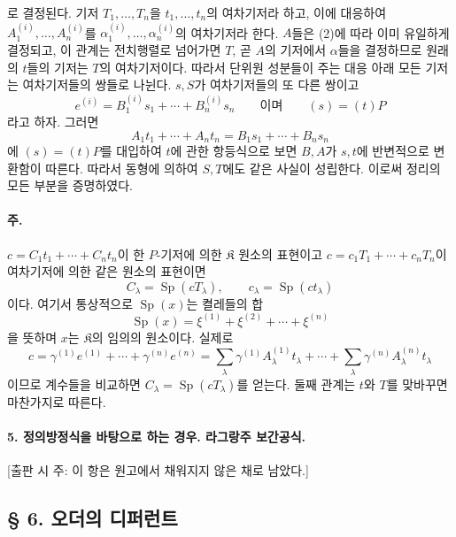 로 결정된다. 기저 \(T_1,\ldots,T_n\)을 \(t_1,\ldots,t_n\)의 여차기저라 하고, 이에 대응하여 \(A_1^{(i)},\ldots,A_n^{(i)}\)를 \(\alpha_1^{(i)},\ldots,\alpha_n^{(i)}\)의 여차기저라 한다. \(A\)들은 (2)에 따라 이미 유일하게 결정되고, 이 관계는 전치행렬로 넘어가면 \(T\), 곧 \(A\)의 기저에서 \(\alpha\)들을 결정하므로 원래의 \(t\)들의 기저는 \(T\)의 여차기저이다. 따라서 단위원 성분들이 주는 대응 아래 모든 기저는 여차기저들의 쌍들로 나뉜다. \(s,S\)가 여차기저들의 또 다른 쌍이고
\[
e^{(i)}=B_1^{(i)}s_1+\cdots+B_n^{(i)}s_n
\qquad\text{이며}\qquad (s)=(t)P
\]
라고 하자. 그러면
\[
A_1t_1+\cdots+A_nt_n=B_1s_1+\cdots+B_ns_n
\]
에 \((s)=(t)P\)를 대입하여 \(t\)에 관한 항등식으로 보면 \(B,A\)가 \(s,t\)에 반변적으로 변환함이 따른다. 따라서 동형에 의하여 \(S,T\)에도 같은 사실이 성립한다. 이로써 정리의 모든 부분을 증명하였다.

\paragraph{주.}
\(c=C_1t_1+\cdots+C_nt_n\)이 한 \(P\)-기저에 의한 \(\mathfrak K\) 원소의 표현이고 \(c=c_1T_1+\cdots+c_nT_n\)이 여차기저에 의한 같은 원소의 표현이면
\[
C_\lambda=\operatorname{Sp}(cT_\lambda),
\qquad c_\lambda=\operatorname{Sp}(ct_\lambda)
\]
이다. 여기서 통상적으로 \(\operatorname{Sp}(x)\)는 켤레들의 합
\[
\operatorname{Sp}(x)=\xi^{(1)}+\xi^{(2)}+\cdots+\xi^{(n)}
\]
을 뜻하며 \(x\)는 \(\mathfrak K\)의 임의의 원소이다. 실제로
\[
c=\gamma^{(1)}e^{(1)}+\cdots+\gamma^{(n)}e^{(n)}
=\sum_\lambda\gamma^{(1)}A_\lambda^{(1)}t_\lambda+
\cdots+\sum_\lambda\gamma^{(n)}A_\lambda^{(n)}t_\lambda
\]
이므로 계수들을 비교하면 \(C_\lambda=\operatorname{Sp}(cT_\lambda)\)를 얻는다. 둘째 관계는 \(t\)와 \(T\)를 맞바꾸면 마찬가지로 따른다.

\paragraph{5. 정의방정식을 바탕으로 하는 경우. 라그랑주 보간공식.}
[출판 시 주: 이 항은 원고에서 채워지지 않은 채로 남았다.]

\subsection*{§ 6. 오더의 디퍼런트}


